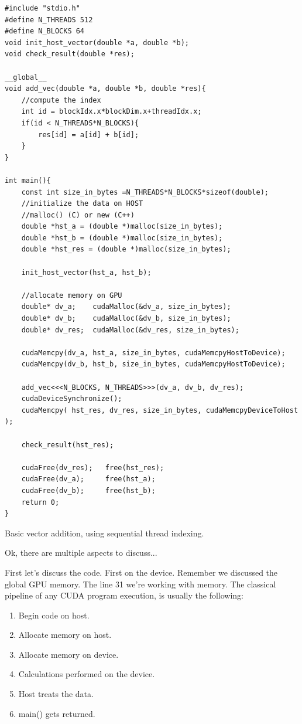 \begin{listing}
\begin{verbatim}
#include "stdio.h"
#define N_THREADS 512
#define N_BLOCKS 64 
void init_host_vector(double *a, double *b);
void check_result(double *res);

__global__ 
void add_vec(double *a, double *b, double *res){
    //compute the index
    int id = blockIdx.x*blockDim.x+threadIdx.x;
    if(id < N_THREADS*N_BLOCKS){
        res[id] = a[id] + b[id];
    }
}

int main(){
    const int size_in_bytes =N_THREADS*N_BLOCKS*sizeof(double);
    //initialize the data on HOST
    //malloc() (C) or new (C++) 
    double *hst_a = (double *)malloc(size_in_bytes);
    double *hst_b = (double *)malloc(size_in_bytes);
    double *hst_res = (double *)malloc(size_in_bytes);

    init_host_vector(hst_a, hst_b);

    //allocate memory on GPU
    double* dv_a;    cudaMalloc(&dv_a, size_in_bytes);
    double* dv_b;    cudaMalloc(&dv_b, size_in_bytes);
    double* dv_res;  cudaMalloc(&dv_res, size_in_bytes);

    cudaMemcpy(dv_a, hst_a, size_in_bytes, cudaMemcpyHostToDevice);
    cudaMemcpy(dv_b, hst_b, size_in_bytes, cudaMemcpyHostToDevice);

    add_vec<<<N_BLOCKS, N_THREADS>>>(dv_a, dv_b, dv_res);
    cudaDeviceSynchronize();
    cudaMemcpy( hst_res, dv_res, size_in_bytes, cudaMemcpyDeviceToHost );

    check_result(hst_res);

    cudaFree(dv_res);   free(hst_res);
    cudaFree(dv_a);     free(hst_a);  
    cudaFree(dv_b);     free(hst_b);
    return 0;
}
\end{verbatim}
    \caption{Basic vector addition, using sequential thread indexing. \cite{tuomanen2018hands}}
\end{listing}

Ok, there are multiple aspects to discuss...

First let's discuss the code. First on the device. Remember we discussed the global GPU memory. 
The line 31 we're working with memory. The classical pipeline of any CUDA program
execution, is usually the following:

\begin{enumerate}
\setlength\itemsep{-0.5em}
   \item Begin code on host.
   \item Allocate memory on host.
   \item Allocate memory on device.
   \item Calculations performed on the device.
   \item Host treats the data.
   \item main() gets returned.
\end{enumerate} 

